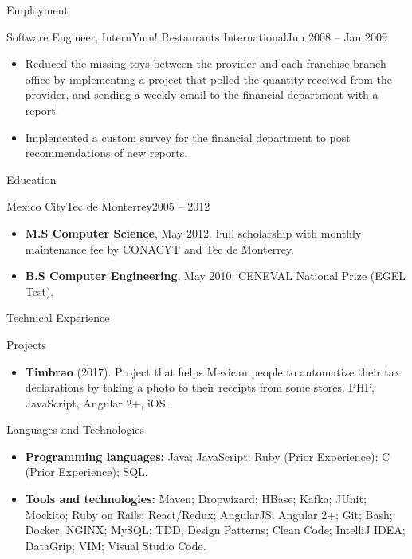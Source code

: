 \documentclass[calibri]{../macdowell-cv/mcdowellcv}
\begin{document}
\begin{cvsection}{Employment}
		\begin{cvsubsection}{Software Engineer, Intern}{Yum! Restaurants International}{Jun 2008 -- Jan 2009}
			\begin{itemize}
				\item Reduced the missing toys between the provider and each franchise branch office by implementing a project that polled the quantity received from the provider, and sending a weekly email to the financial department with a report.
				\item Implemented a custom survey for the financial department to post recommendations of new reports.
			\end{itemize}
		\end{cvsubsection}
	\end{cvsection}
	
	\begin{cvsection}{Education}
		\begin{cvsubsection}{Mexico City}{Tec de Monterrey}{2005 -- 2012}
			\begin{itemize}
				\item \textbf{M.S Computer Science}, May 2012. Full scholarship with monthly maintenance fee by CONACYT and Tec de Monterrey.
				\item \textbf{B.S Computer Engineering}, May 2010. CENEVAL National Prize (EGEL Test).
			\end{itemize}
		\end{cvsubsection}
	\end{cvsection}
	
	\begin{cvsection}{Technical Experience}
		\begin{cvsubsection}{Projects}{}{}
			\begin{itemize}
				\item \textbf{Timbrao} (2017). Project that helps Mexican people to automatize their tax declarations by taking a photo to their receipts from some stores.  PHP, JavaScript, Angular 2+, iOS.
			\end{itemize}
		\end{cvsubsection}
	\end{cvsection}
	
	\begin{cvsection}{Languages and Technologies}
		\begin{cvsubsection}{}{}{}	
			\begin{itemize}
				\item \textbf{Programming languages:} Java; JavaScript; Ruby (Prior Experience); C (Prior Experience); SQL.
				\item \textbf{Tools and technologies:} Maven; Dropwizard; HBase; Kafka; JUnit; Mockito; Ruby on Rails; React/Redux; AngularJS; Angular 2+; Git; Bash; Docker; NGINX; MySQL; TDD; Design Patterns; Clean Code; IntelliJ IDEA; DataGrip; VIM; Visual Studio Code.
			\end{itemize}
		\end{cvsubsection}
	\end{cvsection}
	
\end{document}
